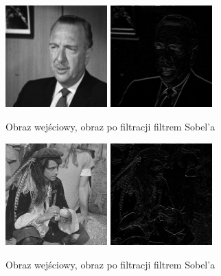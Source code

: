 \documentclass[final,a4paper,openany,12pt]{mwbk}
\begin{document}
\begin{figure}[H]
	\begin{center}
		\includegraphics[width=0.35\textwidth]{gentelman_gray}
		\includegraphics[width=0.35\textwidth]{gentelman_gray_highpassSobol_result}
	\end{center}
	\caption{Obraz wejściowy, obraz po filtracji filtrem Sobel'a}
\end{figure}

\begin{figure}[H]
	\begin{center}
		\includegraphics[width=0.35\textwidth]{pirate_gray}
		\includegraphics[width=0.35\textwidth]{pirate_gray_highpassSobol_result}
	\end{center}
	\caption{Obraz wejściowy, obraz po filtracji filtrem Sobel'a}
\end{figure}
\end{document}
